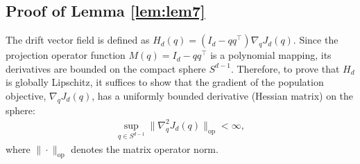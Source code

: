 \documentclass[11pt,a4paper]{article}
\theoremstyle{definition}
\begin{document}
\subsection{Proof of Lemma \ref{lem:lem7}}
The drift vector field is defined as $H_d(q) = (I_d - q q^\top) \nabla_q J_d(q)$. Since the projection operator function $M(q) = I_d - q q^\top$ is a polynomial mapping, its derivatives are bounded on the compact sphere $S^{d-1}$. Therefore, to prove that $H_d$ is globally Lipschitz, it suffices to show that the gradient of the population objective, $\nabla_q J_d(q)$, has a uniformly bounded derivative (Hessian matrix) on the sphere:
\begin{align}
\sup_{q \in S^{d-1}} \| \nabla_q^2 J_d(q) \|_{\text{op}} < \infty,
\end{align}
where $\|\cdot\|_{\text{op}}$ denotes the matrix operator norm.
\end{document}
